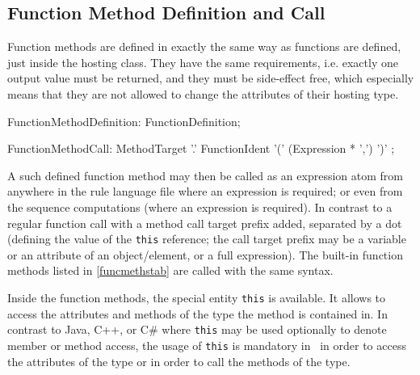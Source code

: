 \subsection{Function Method Definition and Call}\label{sub:functionmethods}\label{sec:funcmethcall} 

Function methods are defined in exactly the same way as functions are defined, just inside the hosting class.
They have the same requirements, 
i.e. exactly one output value must be returned, 
and they must be side-effect free, which especially means that they are not allowed to change the attributes of their hosting type.

\begin{rail} 
  FunctionMethodDefinition: FunctionDefinition;
\end{rail}

\begin{rail}
  FunctionMethodCall: MethodTarget '.' FunctionIdent '(' (Expression * ',') ')' ;
\end{rail}

A such defined function method may then be called as an expression atom from anywhere in the rule language file where an expression is required; or even from the sequence computations (where an expression is required).
In contrast to a regular function call with a method call target prefix added, separated by a dot (defining the value of the \texttt{this} reference; the call target prefix may be a variable or an attribute of an object/element, or a full expression).
The built-in function methods listed in \ref{funcmethstab} are called with the same syntax.

Inside the function methods, the special entity \texttt{this} is available.
It allows to access the attributes and methods of the type the method is contained in.
In contrast to Java, C++, or C\# where \texttt{this} may be used optionally to denote member or method access,
the usage of \texttt{this} is mandatory in \GrG~in order to access the attributes of the type or in order to call the methods of the type.


